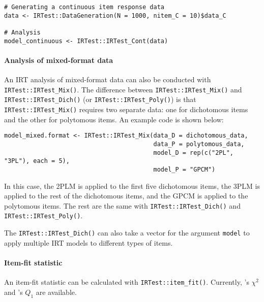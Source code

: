 \begin{verbatim}
# Generating a continuous item response data
data <- IRTest::DataGeneration(N = 1000, nitem_C = 10)$data_C

# Analysis
model_continuous <- IRTest::IRTest_Cont(data)
\end{verbatim}

\hypertarget{analysis-of-mixed-format-data}{%
\paragraph*{Analysis of mixed-format data}\label{analysis-of-mixed-format-data}}

An IRT analysis of mixed-format data can also be conducted with
\texttt{IRTest::IRTest\_Mix()}. The difference between \texttt{IRTest::IRTest\_Mix()} and
\texttt{IRTest::IRTest\_Dich()} (or \texttt{IRTest::IRTest\_Poly()}) is that
\texttt{IRTest::IRTest\_Mix()} requires two separate data: one for dichotomous items
and the other for polytomous items. An example code is shown below:

\begin{verbatim}
model_mixed.format <- IRTest::IRTest_Mix(data_D = dichotomous_data,
                                         data_P = polytomous_data,
                                         model_D = rep(c("2PL", "3PL"), each = 5),
                                         model_P = "GPCM")
\end{verbatim}

In this case, the 2PLM is applied to the first five dichotomous items,
the 3PLM is applied to the rest of the dichotomous items, and the GPCM
is applied to the polytomous items. The rest are the same with
\texttt{IRTest::IRTest\_Dich()} and \texttt{IRTest::IRTest\_Poly()}.

The \texttt{IRTest::IRTest\_Dich()} can also take a vector for the argument \texttt{model} to
apply multiple IRT models to different types of items.

\hypertarget{item-fit-statistic}{%
\paragraph*{Item-fit statistic}\label{item-fit-statistic}}

An item-fit statistic can be calculated with \texttt{IRTest::item\_fit()}. Currently,
\citet{Bock:1960}'s \(\chi^{2}\) and \citet{Yen:1981}'s \(Q_{1}\) are available.



\address{%
Seewoo Li\\
University of California, Los Angeles\\%
Social Research Methodology\\ School of Education \& Information Studies\\ Los Angeles, California\\
%
%
\textit{ORCiD: \href{https://orcid.org/0000-0002-6290-2777}{0000-0002-6290-2777}}\\%
\href{mailto:seewooli@g.ucla.edu}{\nolinkurl{seewooli@g.ucla.edu}}%
}
